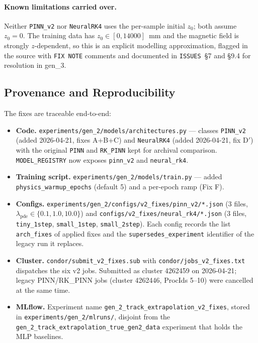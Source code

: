 \documentclass[a4paper,11pt]{article}
\newcommand{\num}[1]{#1}
\begin{document}
\paragraph{Known limitations carried over.}
Neither \texttt{PINN\_v2} nor \texttt{NeuralRK4} uses the per-sample
initial $z_0$; both assume $z_0 = 0$.  The training data has
$z_0 \in [0, 14000]$~mm and the magnetic field is strongly
$z$-dependent, so this is an explicit modelling approximation, flagged
in the source with \texttt{FIX NOTE} comments and documented in
\texttt{ISSUES}~\S7 and \S9.4 for resolution in gen\_3.

\subsection{Provenance and Reproducibility}
\label{sec:v2_provenance}

The fixes are traceable end-to-end:
\begin{itemize}
  \item \textbf{Code.}
    \texttt{experiments/gen\_2/models/architectures.py} --- classes
    \texttt{PINN\_v2} (added 2026-04-21, fixes A+B+C) and
    \texttt{NeuralRK4} (added 2026-04-21, fix D$'$) with the original
    \texttt{PINN} and \texttt{RK\_PINN} kept for archival comparison.
    \texttt{MODEL\_REGISTRY} now exposes \texttt{pinn\_v2} and
    \texttt{neural\_rk4}.
  \item \textbf{Training script.}
    \texttt{experiments/gen\_2/models/train.py} --- added
    \texttt{physics\_warmup\_epochs} (default 5) and a per-epoch ramp
    (Fix F).
  \item \textbf{Configs.}
    \texttt{experiments/gen\_2/configs/v2\_fixes/pinn\_v2/*.json}
    (\num{3} files, $\lambda_\text{pde} \in \{0.1, 1.0, 10.0\}$) and
    \texttt{configs/v2\_fixes/neural\_rk4/*.json} (\num{3} files,
    \texttt{tiny\_1step}, \texttt{small\_1step}, \texttt{small\_2step}).
    Each config records the list \texttt{arch\_fixes} of applied fixes
    and the \texttt{supersedes\_experiment} identifier of the legacy run
    it replaces.
  \item \textbf{Cluster.}
    \texttt{condor/submit\_v2\_fixes.sub} with
    \texttt{condor/jobs\_v2\_fixes.txt} dispatches the six v2 jobs.
    Submitted as cluster 4262459 on 2026-04-21; legacy PINN/RK\_PINN
    jobs (cluster 4262446, ProcIds 5--10) were cancelled at the same
    time.
  \item \textbf{MLflow.}
    Experiment name
    \texttt{gen\_2\_track\_extrapolation\_v2\_fixes}, stored in
    \texttt{experiments/gen\_2/mlruns/}, disjoint from the
    \texttt{gen\_2\_track\_extrapolation\_true\_gen2\_data} experiment
    that holds the MLP baselines.
\end{itemize}
\end{document}
